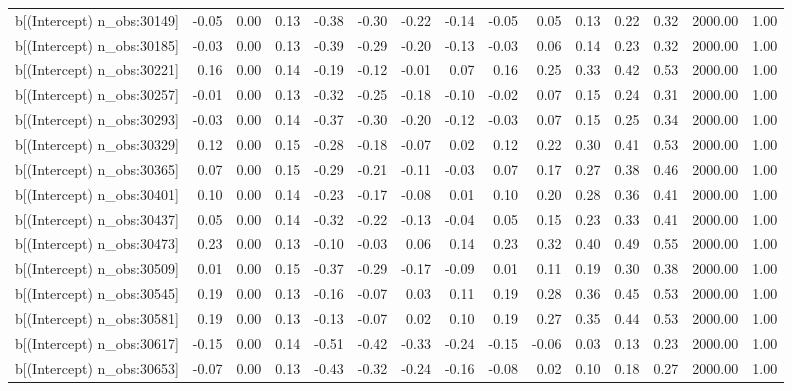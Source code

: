 \begin{table}[ht]
\begin{tabular}{rrrrrrrrrrrrrrr}
  b[(Intercept) n\_obs:30149] & -0.05 & 0.00 & 0.13 & -0.38 & -0.30 & -0.22 & -0.14 & -0.05 & 0.05 & 0.13 & 0.22 & 0.32 & 2000.00 & 1.00 \\ 
  b[(Intercept) n\_obs:30185] & -0.03 & 0.00 & 0.13 & -0.39 & -0.29 & -0.20 & -0.13 & -0.03 & 0.06 & 0.14 & 0.23 & 0.32 & 2000.00 & 1.00 \\ 
  b[(Intercept) n\_obs:30221] & 0.16 & 0.00 & 0.14 & -0.19 & -0.12 & -0.01 & 0.07 & 0.16 & 0.25 & 0.33 & 0.42 & 0.53 & 2000.00 & 1.00 \\ 
  b[(Intercept) n\_obs:30257] & -0.01 & 0.00 & 0.13 & -0.32 & -0.25 & -0.18 & -0.10 & -0.02 & 0.07 & 0.15 & 0.24 & 0.31 & 2000.00 & 1.00 \\ 
  b[(Intercept) n\_obs:30293] & -0.03 & 0.00 & 0.14 & -0.37 & -0.30 & -0.20 & -0.12 & -0.03 & 0.07 & 0.15 & 0.25 & 0.34 & 2000.00 & 1.00 \\ 
  b[(Intercept) n\_obs:30329] & 0.12 & 0.00 & 0.15 & -0.28 & -0.18 & -0.07 & 0.02 & 0.12 & 0.22 & 0.30 & 0.41 & 0.53 & 2000.00 & 1.00 \\ 
  b[(Intercept) n\_obs:30365] & 0.07 & 0.00 & 0.15 & -0.29 & -0.21 & -0.11 & -0.03 & 0.07 & 0.17 & 0.27 & 0.38 & 0.46 & 2000.00 & 1.00 \\ 
  b[(Intercept) n\_obs:30401] & 0.10 & 0.00 & 0.14 & -0.23 & -0.17 & -0.08 & 0.01 & 0.10 & 0.20 & 0.28 & 0.36 & 0.41 & 2000.00 & 1.00 \\ 
  b[(Intercept) n\_obs:30437] & 0.05 & 0.00 & 0.14 & -0.32 & -0.22 & -0.13 & -0.04 & 0.05 & 0.15 & 0.23 & 0.33 & 0.41 & 2000.00 & 1.00 \\ 
  b[(Intercept) n\_obs:30473] & 0.23 & 0.00 & 0.13 & -0.10 & -0.03 & 0.06 & 0.14 & 0.23 & 0.32 & 0.40 & 0.49 & 0.55 & 2000.00 & 1.00 \\ 
  b[(Intercept) n\_obs:30509] & 0.01 & 0.00 & 0.15 & -0.37 & -0.29 & -0.17 & -0.09 & 0.01 & 0.11 & 0.19 & 0.30 & 0.38 & 2000.00 & 1.00 \\ 
  b[(Intercept) n\_obs:30545] & 0.19 & 0.00 & 0.13 & -0.16 & -0.07 & 0.03 & 0.11 & 0.19 & 0.28 & 0.36 & 0.45 & 0.53 & 2000.00 & 1.00 \\ 
  b[(Intercept) n\_obs:30581] & 0.19 & 0.00 & 0.13 & -0.13 & -0.07 & 0.02 & 0.10 & 0.19 & 0.27 & 0.35 & 0.44 & 0.53 & 2000.00 & 1.00 \\ 
  b[(Intercept) n\_obs:30617] & -0.15 & 0.00 & 0.14 & -0.51 & -0.42 & -0.33 & -0.24 & -0.15 & -0.06 & 0.03 & 0.13 & 0.23 & 2000.00 & 1.00 \\ 
  b[(Intercept) n\_obs:30653] & -0.07 & 0.00 & 0.13 & -0.43 & -0.32 & -0.24 & -0.16 & -0.08 & 0.02 & 0.10 & 0.18 & 0.27 & 2000.00 & 1.00 \\ 

\end{tabular}
\end{table}
